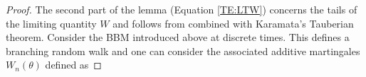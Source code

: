 \documentclass[11pt]{article}
\theoremstyle{plain}
\begin{document}
\begin{proof}

The second part of the lemma (Equation \eqref{TE:LTW}) concerns the tails of the limiting quantity $W$ and follows from \cite[Theorem 2.2]{Liu:2000aa} combined with Karamata's Tauberian theorem. Consider the BBM introduced above at discrete times. This defines a branching random walk and one can consider the associated additive martingales $W_n(\theta)$ defined as



\end{proof}
\end{document}
